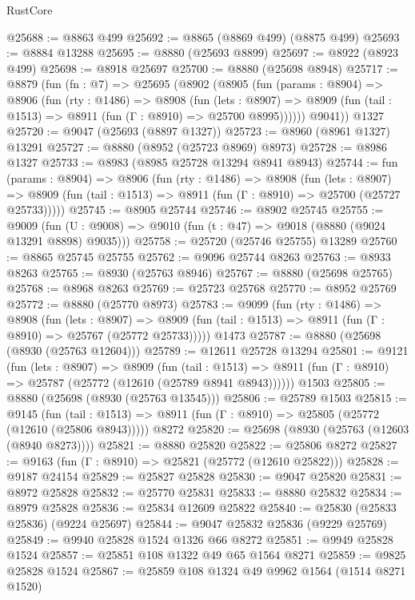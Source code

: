 \begin{lexlean}{RustCore}
\begin{coremodule}
@25688 := @8863 @499
@25692 := @8865 (@8869 @499) (@8875 @499)
@25693 := @8884 @13288
@25695 := @8880 (@25693 @8899)
@25697 := @8922 (@8923 @499)
@25698 := @8918 @25697
@25700 := @8880 (@25698 @8948)
@25717 := @8879
    (fun (fn : @7) =>
    @25695
      (@8902
        (@8905
          (fun (params : @8904) =>
          @8906
            (fun (rty : @1486) =>
            @8908
              (fun (lets : @8907) =>
              @8909 (fun (tail : @1513) => @8911 (fun (Γ : @8910) => @25700 @8995))))))
        @9041))
    @1327
@25720 := @9047 (@25693 (@8897 @1327))
@25723 := @8960 (@8961 @1327) @13291
@25727 := @8880 (@8952 (@25723 @8969) @8973)
@25728 := @8986 @1327
@25733 := @8983 (@8985 @25728 @13294 @8941 @8943)
@25744 := fun (params : @8904) =>
  @8906
    (fun (rty : @1486) =>
    @8908
      (fun (lets : @8907) =>
      @8909 (fun (tail : @1513) => @8911 (fun (Γ : @8910) => @25700 (@25727 @25733)))))
@25745 := @8905 @25744
@25746 := @8902 @25745
@25755 := @9009
    (fun (U : @9008) => @9010 (fun (t : @47) => @9018 (@8880 (@9024 @13291 @8898) @9035)))
@25758 := @25720 (@25746 @25755) @13289
@25760 := @8865 @25745 @25755
@25762 := @9096 @25744 @8263
@25763 := @8933 @8263
@25765 := @8930 (@25763 @8946)
@25767 := @8880 (@25698 @25765)
@25768 := @8968 @8263
@25769 := @25723 @25768
@25770 := @8952 @25769
@25772 := @8880 (@25770 @8973)
@25783 := @9099
    (fun (rty : @1486) =>
    @8908
      (fun (lets : @8907) =>
      @8909 (fun (tail : @1513) => @8911 (fun (Γ : @8910) => @25767 (@25772 @25733)))))
    @1473
@25787 := @8880 (@25698 (@8930 (@25763 @12604)))
@25789 := @12611 @25728 @13294
@25801 := @9121
    (fun (lets : @8907) =>
    @8909
      (fun (tail : @1513) =>
      @8911 (fun (Γ : @8910) => @25787 (@25772 (@12610 (@25789 @8941 @8943))))))
    @1503
@25805 := @8880 (@25698 (@8930 (@25763 @13545)))
@25806 := @25789 @1503
@25815 := @9145
    (fun (tail : @1513) => @8911 (fun (Γ : @8910) => @25805 (@25772 (@12610 (@25806 @8943)))))
    @8272
@25820 := @25698 (@8930 (@25763 (@12603 (@8940 @8273))))
@25821 := @8880 @25820
@25822 := @25806 @8272
@25827 := @9163 (fun (Γ : @8910) => @25821 (@25772 (@12610 @25822)))
@25828 := @9187 @24154
@25829 := @25827 @25828
@25830 := @9047 @25820
@25831 := @8972 @25828
@25832 := @25770 @25831
@25833 := @8880 @25832
@25834 := @8979 @25828
@25836 := @25834 @12609 @25822
@25840 := @25830 (@25833 @25836) (@9224 @25697)
@25844 := @9047 @25832 @25836 (@9229 @25769)
@25849 := @9940 @25828 @1524 @1326 @66 @8272
@25851 := @9949 @25828 @1524
@25857 := @25851 @108 @1322 @49 @65 @1564 @8271
@25859 := @9825 @25828 @1524
@25867 := @25859 @108 @1324 @49 @9962 @1564 (@1514 @8271 @1520)

\end{coremodule}
\end{lexlean}

